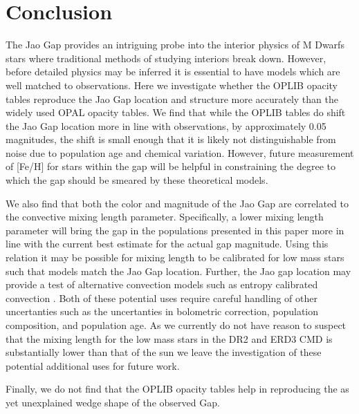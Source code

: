 \section{Conclusion}\label{sec:conclusion}
%
%
The Jao Gap provides an intriguing probe into the interior physics of M Dwarfs
stars where traditional methods of studying interiors break down. However,
before detailed physics may be inferred it is essential to have models which
are well matched to observations. Here we investigate whether the OPLIB opacity
tables reproduce the Jao Gap location and structure more accurately than the
widely used OPAL opacity tables. We find that while the OPLIB tables do shift
the Jao Gap location more in line with observations, by approximately 0.05
magnitudes, the shift is small enough that it is likely not distinguishable
from noise due to population age and chemical variation. However, future
measurement of [Fe/H] for stars within the gap will be helpful in constraining
the degree to which the gap should be smeared by these theoretical models.

We also find that both the color and magnitude of the Jao Gap are
correlated to the convective mixing length parameter. Specifically, a lower
mixing length parameter will bring the gap in the populations presented in this
paper more in line with the current best estimate for the actual gap magnitude.
Using this relation it may be possible for mixing length to be calibrated for
low mass stars such that models match the Jao Gap location. Further, the Jao
gap location may provide a test of alternative convection models such as
entropy calibrated convection \citep{Spada2021}. Both of these potential uses
require careful handling of other uncertanties such as the uncertanties in
bolometric correction, population composition, and population age. As we
currently do not have reason to suspect that the mixing length for the low mass
stars in the DR2 and ERD3 CMD is substantially lower than that of the sun we
leave the investigation of these potential additional uses for future work.

Finally, we do not find that the OPLIB opacity tables help in reproducing the
as yet unexplained wedge shape of the observed Gap.
